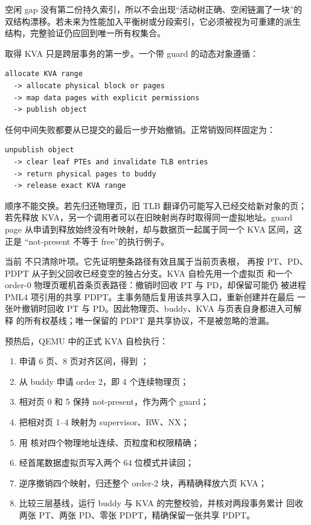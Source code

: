 空闲 gap 没有第二份持久索引，所以不会出现“活动树正确、空闲链漏了一块”的
双结构漂移。若未来为性能加入平衡树或分段索引，它必须被视为可重建的派生
结构，完整验证仍应回到唯一所有权集合。

取得 KVA 只是跨层事务的第一步。一个带 guard 的动态对象遵循：

\begin{verbatim}
allocate KVA range
  -> allocate physical block or pages
  -> map data pages with explicit permissions
  -> publish object
\end{verbatim}

任何中间失败都要从已提交的最后一步开始撤销。正常销毁同样固定为：

\begin{verbatim}
unpublish object
  -> clear leaf PTEs and invalidate TLB entries
  -> return physical pages to buddy
  -> release exact KVA range
\end{verbatim}

顺序不能交换。若先归还物理页，旧 TLB 翻译仍可能写入已经交给新对象的页；
若先释放 KVA，另一个调用者可以在旧映射尚存时取得同一虚拟地址。guard page
从申请到释放始终没有叶映射，却与数据页一起属于同一个 KVA 区间，这正是
“not-present 不等于 free”的执行例子。

当前  不只清除叶项。它先证明整条路径有效且属于当前页表根，
再按 PT、PD、PDPT 从子到父回收已经变空的独占分支。KVA 自检先用一个虚拟页
和一个 order-0 物理页暖机首条页表路径：撤销时回收 PT 与 PD，却保留可能仍
被进程 PML4 项引用的共享 PDPT。主事务随后复用该共享入口，重新创建并在最后
一张叶撤销时回收 PT 与 PD。因此物理页、buddy、KVA 与页表自身都进入可解释
的所有权基线；唯一保留的 PDPT 是共享协议，不是被忽略的泄漏。

预热后，QEMU 中的正式 KVA 自检执行：

\begin{enumerate}[label=\arabic*.]
  \item 申请 6 页、8 页对齐区间，得到
        ；
  \item 从 buddy 申请 order 2，即 4 个连续物理页；
  \item 相对页 0 和 5 保持 not-present，作为两个 guard；
  \item 把相对页 1--4 映射为 supervisor、RW、NX；
  \item 用  核对四个物理地址连续、页粒度和权限精确；
  \item 经首尾数据虚拟页写入两个 64 位模式并读回；
  \item 逆序撤销四个映射，归还整个 order-2 块，再精确释放六页 KVA；
  \item 比较三层基线，运行 buddy 与 KVA 的完整校验，并核对两段事务累计
        回收两张 PT、两张 PD、零张 PDPT，精确保留一张共享 PDPT。
\end{enumerate}

